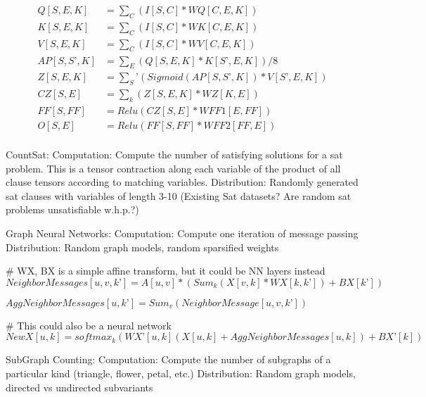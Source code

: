 \documentclass{article}
\begin{document}
 \begin{align*}
Q[S, E, K] &= \sum_C(I[S, C] * WQ[C, E, K])\\
K[S, E, K] &= \sum_C(I[S, C] * WK[C, E, K])\\
V[S, E, K] &= \sum_C(I[S, C] * WV[C, E, K])\\
AP[S, S’, K] &= \sum_E(Q[S, E, K] * K[S’, E, K]) / 8\\
Z[S, E, K] &= \sum_S’(Sigmoid(AP[S,S’,K]) * V[S’, E, K])\\
CZ[S, E] &= \sum_k(Z[S, E, K] * WZ[K,E])\\
FF[S,FF] &= Relu(CZ[S,E] * WFF1[E,FF])\\
O[S,E] &= Relu(FF[S,FF] * WFF2[FF,E])\\
\end{align*}

CountSat:
	Computation: Compute the number of satisfying solutions for a sat problem. This is a tensor contraction along each variable of the product of all clause tensors according to matching variables.
	Distribution: Randomly generated sat clauses with variables of length 3-10 (Existing Sat datasets? Are random sat problems unsatisfiable w.h.p.?)

Graph Neural Networks:
	Computation: Compute one iteration of message passing
	Distribution: Random graph models, random sparsified weights

# WX, BX is a simple affine transform, but it could be NN layers instead
$NeighborMessages[u, v, k’] = A[u, v]*(Sum_k(X[v, k]*WX[k, k’]) +BX[k’])  $

$AggNeighborMessages[u, k’] = Sum_v(NeighborMessage[u, v, k’])$

# This could also be a neural network
$NewX[u, k] = softmax_k(WX’[u,k](X[u, k] +AggNeighborMessages[u,k]) + BX’[k]) $

SubGraph Counting:
	Computation: Compute the number of subgraphs of a particular kind (triangle, flower, petal, etc.)
	Distribution: Random graph models, directed vs undirected subvariants
\end{document}

